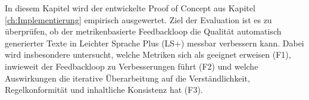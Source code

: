 
In diesem Kapitel wird der entwickelte Proof of Concept aus Kapitel \ref{ch:Implementierung} empirisch ausgewertet.
Ziel der Evaluation ist es zu überprüfen, ob der metrikenbasierte Feedbackloop die Qualität automatisch generierter Texte in Leichter Sprache Plus (LS+) messbar verbessern kann.
Dabei wird insbesondere untersucht, welche Metriken sich als geeignet erweisen (F1), inwieweit der Feedbackloop zu Verbesserungen führt (F2) und welche Auswirkungen die iterative Überarbeitung auf die Verständlichkeit, Regelkonformität und inhaltliche Konsistenz hat (F3).
